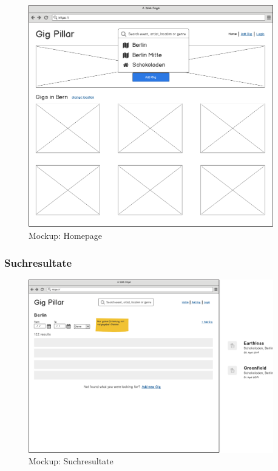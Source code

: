 \begin{figure}[!htb]
  \centering
  \includegraphics[width=0.95\textwidth]{mockups/homepage.png}
  \caption{Mockup: Homepage}
\end{figure}

\clearpage
\subsubsection{Suchresultate}

\begin{figure}[!htb]
  \centering
  \includegraphics[width=0.95\textwidth]{mockups/search-result.png}
  \caption{Mockup: Suchresultate}
\end{figure}

